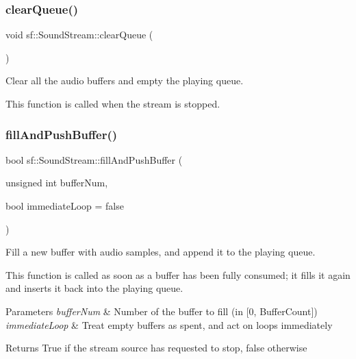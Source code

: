 \subsubsection{\texorpdfstring{clearQueue()}{clearQueue()}}
{\footnotesize\ttfamily void sf\+::\+Sound\+Stream\+::clear\+Queue (\begin{DoxyParamCaption}{ }\end{DoxyParamCaption})\hspace{0.3cm}{\ttfamily [private]}}



Clear all the audio buffers and empty the playing queue. 

This function is called when the stream is stopped. \begin{DoxyVerb}\end{DoxyVerb}
 \mbox{\label{classsf_1_1_sound_stream_ad3e04f1b4df1fbe0ffd474f47ed91f4a}} 
\subsubsection{\texorpdfstring{fillAndPushBuffer()}{fillAndPushBuffer()}}
{\footnotesize\ttfamily bool sf\+::\+Sound\+Stream\+::fill\+And\+Push\+Buffer (\begin{DoxyParamCaption}\item[{unsigned int}]{buffer\+Num,  }\item[{bool}]{immediate\+Loop = {\ttfamily false} }\end{DoxyParamCaption})\hspace{0.3cm}{\ttfamily [private]}}



Fill a new buffer with audio samples, and append it to the playing queue. 

This function is called as soon as a buffer has been fully consumed; it fills it again and inserts it back into the playing queue.


\begin{DoxyParams}{Parameters}
{\em buffer\+Num} & Number of the buffer to fill (in \mbox{[}0, Buffer\+Count\mbox{]}) \\
\hline
{\em immediate\+Loop} & Treat empty buffers as spent, and act on loops immediately\\
\hline
\end{DoxyParams}
\begin{DoxyReturn}{Returns}
True if the stream source has requested to stop, false otherwise \begin{DoxyVerb}\end{DoxyVerb}
 
\end{DoxyReturn}
\mbox{\label{classsf_1_1_sound_stream_abf8cdcc65da5e31c14f9bddccb53fb72}} 
